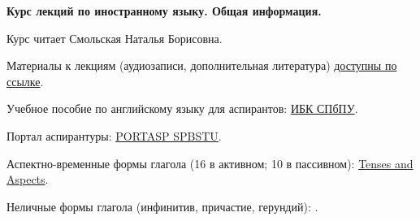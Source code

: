 \documentclass[main.tex]{subfiles}
\begin{document}
{\parindent0pt

\textbf{Курс лекций по иностранному языку. Общая информация.}

Курс читает Смольская Наталья Борисовна.

Материалы к лекциям (аудиозаписи, дополнительная литература) \href{https://drive.google.com/drive/folders/1iSx2EjJJ98rhPpOsM4xGcJA7-7qitQHM?usp=sharing}{доступны по ссылке}.

Учебное пособие по английскому языку для аспирантов: \href{https://elib.spbstu.ru/dl/2/s19-119.pdf/info}{ИБК СПбПУ}.

Портал аспирантуры: \href{https://portasp.spbstu.ru/login/index.php}{PORTASP SPBSTU}.

Аспектно-временные формы глагола (16 в активном; 10 в пассивном): \href{https://mualal.github.io/asp/english/EnglishTensesAspectsVoicesPoster.pdf}{Tenses and Aspects}.

Неличные формы глагола (инфинитив, причастие, герундий): \hyperref[sec:impersonal]{\color{blue}{Impersonal Forms}}.

}
\end{document}
